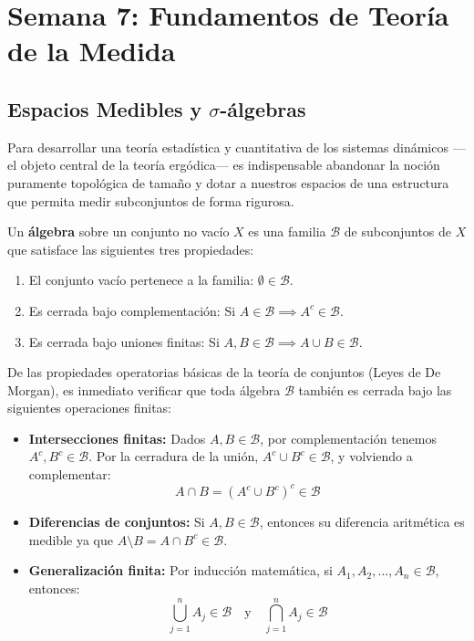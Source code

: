 
\chapter{Semana 7: Fundamentos de Teoría de la Medida}

\section{Espacios Medibles y \texorpdfstring{$\sigma$}{sigma}-álgebras}

Para desarrollar una teoría estadística y cuantitativa de los sistemas dinámicos —el objeto central de la teoría ergódica— es indispensable abandonar la noción puramente topológica de tamaño y dotar a nuestros espacios de una estructura que permita medir subconjuntos de forma rigurosa.

\begin{definicion}
	Un \textbf{álgebra} sobre un conjunto no vacío $X$ es una familia $\mathcal{B}$ de subconjuntos de $X$ que satisface las siguientes tres propiedades:
	\begin{enumerate}[1)]
		\item El conjunto vacío pertenece a la familia: $\emptyset \in \mathcal{B}$.
		\item Es cerrada bajo complementación: Si $A \in \mathcal{B} \implies A^c \in \mathcal{B}$.
		\item Es cerrada bajo uniones finitas: Si $A, B \in \mathcal{B} \implies A \cup B \in \mathcal{B}$.
	\end{enumerate}
\end{definicion}

\begin{observacion}
	De las propiedades operatorias básicas de la teoría de conjuntos (Leyes de De Morgan), es inmediato verificar que toda álgebra $\mathcal{B}$ también es cerrada bajo las siguientes operaciones finitas:
	\begin{itemize}
		\item \textbf{Intersecciones finitas:} Dados $A, B \in \mathcal{B}$, por complementación tenemos $A^c, B^c \in \mathcal{B}$. Por la cerradura de la unión, $A^c \cup B^c \in \mathcal{B}$, y volviendo a complementar:
		$$ A \cap B = (A^c \cup B^c)^c \in \mathcal{B} $$
		\item \textbf{Diferencias de conjuntos:} Si $A, B \in \mathcal{B}$, entonces su diferencia aritmética es medible ya que $A \setminus B = A \cap B^c \in \mathcal{B}$.
		\item \textbf{Generalización finita:} Por inducción matemática, si $A_1, A_2, \dots, A_n \in \mathcal{B}$, entonces:
		$$ \bigcup_{j=1}^n A_j \in \mathcal{B} \quad \text{y} \quad \bigcap_{j=1}^n A_j \in \mathcal{B} $$
	\end{itemize}
\end{observacion}

